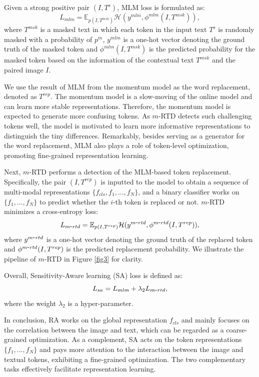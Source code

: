 \documentclass{article}
\begin{document}
Given a strong positive pair $(I, T^s)$, MLM loss is formulated as:
\begin{equation}
    L_{mlm} = \mathbb{E}_{p(I, T^{msk})}{\mathcal{H}}(y^{mlm}, \phi^{mlm}(I, T^{msk})), \label{equ4}
\end{equation}
where $T^{msk}$ is a masked text in which each token in the input text $T^s$ is randomly masked with a probability of $p^{m}$, $y^{mlm}$ is a one-hot vector denoting the ground truth of the masked token and $\phi^{mlm}(I, T^{msk})$ is the predicted probability for the masked token based on the information of the contextual text $T^{msk}$ and the paired image $I$. 

We use the result of MLM from the momentum model as the word replacement, denoted as $T^{rep}$.
The momentum model is a slow-moving of the online model and can learn more stable representations. Therefore, the momentum model is expected to generate more confusing tokens.
As $m$-RTD detects such challenging tokens well, the model is motivated to learn more informative representations to distinguish the tiny differences.
Remarkably, besides serving as a generator for the word replacement, MLM also plays a role of token-level optimization, promoting fine-grained representation learning.

Next, $m$-RTD performs a detection of the MLM-based token replacement. Specifically, the pair $(I, T^{rep})$ is inputted to the model to obtain a sequence of multi-modal representations $\{f_{cls}, f_1, ..., f_N\}$, and a binary classifier works on $\{f_1, ..., f_N\}$ to predict whether the $i$-th token is replaced or not.
$m$-RTD minimizes a cross-entropy loss:
\begin{equation}
    L_{m\raisebox{0mm}{-}rtd} = \mathbb{E}_{p(I, T^{rep})}{\mathcal{H}}(y^{m\raisebox{0mm}{-}rtd}, \phi^{m\raisebox{0mm}{-}rtd}(I, T^{rep})), \label{equ5}
\end{equation}
where $y^{m\raisebox{0mm}{-}rtd}$ is a one-hot vector denoting the ground truth of the replaced token and $\phi^{m\raisebox{0mm}{-}rtd}(I, T^{rep})$ is the predicted replacement probability.
We illustrate the pipeline of $m$-RTD in Figure \ref{fig3} for clarity.

Overall, Sensitivity-Aware learning (SA) loss is defined as:
\begin{equation}
    L_{sa} = L_{mlm} + \lambda_2L_{m\raisebox{0mm}{-}rtd}, \label{equ6}
\end{equation}
where the weight $\lambda_2$ is a hyper-parameter.

In conclusion, RA works on the global representation $f_{cls}$ and mainly focuses on the correlation between the image and text, which can be regarded as a coarse-grained optimization.
As a complement, SA acts on the token representations $\{f_1, ..., f_N\}$ and pays more attention to the interaction between the image and textual tokens, exhibiting a fine-grained optimization.
The two complementary tasks effectively facilitate representation learning.
\end{document}
